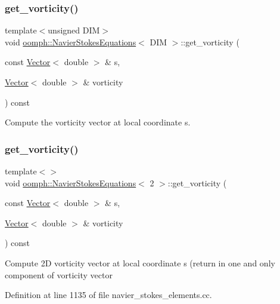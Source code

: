 \subsubsection{\texorpdfstring{get\+\_\+vorticity()}{get\_vorticity()}\hspace{0.1cm}{\footnotesize\ttfamily [1/3]}}
{\footnotesize\ttfamily template$<$unsigned D\+IM$>$ \\
void \hyperlink{classoomph_1_1NavierStokesEquations}{oomph\+::\+Navier\+Stokes\+Equations}$<$ D\+IM $>$\+::get\+\_\+vorticity (\begin{DoxyParamCaption}\item[{const \hyperlink{classoomph_1_1Vector}{Vector}$<$ double $>$ \&}]{s,  }\item[{\hyperlink{classoomph_1_1Vector}{Vector}$<$ double $>$ \&}]{vorticity }\end{DoxyParamCaption}) const}



Compute the vorticity vector at local coordinate s. 

\mbox{\label{classoomph_1_1NavierStokesEquations_a11d44f54aae0eccda7e34e51a270de4a}} 
\subsubsection{\texorpdfstring{get\+\_\+vorticity()}{get\_vorticity()}\hspace{0.1cm}{\footnotesize\ttfamily [2/3]}}
{\footnotesize\ttfamily template$<$$>$ \\
void \hyperlink{classoomph_1_1NavierStokesEquations}{oomph\+::\+Navier\+Stokes\+Equations}$<$ 2 $>$\+::get\+\_\+vorticity (\begin{DoxyParamCaption}\item[{const \hyperlink{classoomph_1_1Vector}{Vector}$<$ double $>$ \&}]{s,  }\item[{\hyperlink{classoomph_1_1Vector}{Vector}$<$ double $>$ \&}]{vorticity }\end{DoxyParamCaption}) const}

Compute 2D vorticity vector at local coordinate s (return in one and only component of vorticity vector 

Definition at line 1135 of file navier\+\_\+stokes\+\_\+elements.\+cc.



